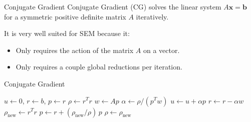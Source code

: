 \begin{frame}{Conjugate Gradient}
    Conjugate Gradient (CG) solves the linear system $A\mathbf{x}=\mathbf{b}$ for a symmetric positive definite matrix $A$ iteratively.

    It is very well suited for SEM because it:
    \begin{itemize}
        \item Only requires the action of the matrix $A$ on a vector.
        \item Only requires a couple global reductions per iteration.
    \end{itemize}

\end{frame}

\begin{frame}{Conjugate Gradient}
    \begin{algorithm}[H]
      \caption{Unpreconditioned CG for $A u = b$}
      \begin{algorithmic}[1]
        \State $u \gets 0$, \quad $r \gets b$, \quad $p \gets r$
        \State $\rho \gets r^{T} r$
          \State $w \gets A p$ 
          \State $\alpha \gets \rho / (p^{T} w)$ 
          \State $u \gets u + \alpha p$
          \State $r \gets r - \alpha w$
          \State $\rho_{\text{new}} \gets r^{T} r$ 
          \State $p \gets r + (\rho_{\text{new}} / \rho) \, p$
          \State $\rho \gets \rho_{\text{new}}$
        \EndWhile
      \end{algorithmic}
    \end{algorithm}
\end{frame}
